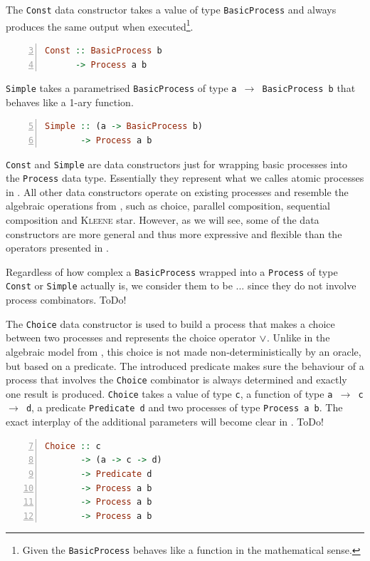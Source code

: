 The \texttt{Const} data constructor takes a value of type \texttt{BasicProcess} and always produces the same output when executed\footnote{Given the \texttt{BasicProcess} behaves like a function in the mathematical sense.}.
\begin{lstlisting}[language=Haskell,caption=Signature of the \texttt{Const} data constructor.,numbers=left,frame=bt,firstnumber=3]
Const :: BasicProcess b
      -> Process a b
\end{lstlisting}

\texttt{Simple} takes a parametrised \texttt{BasicProcess} of type \texttt{a $\to$ BasicProcess b} that behaves like a 1-ary function.
\begin{lstlisting}[language=Haskell,caption=Signature of the \texttt{Simple} data constructor.,numbers=left,frame=bt,firstnumber=5]
Simple :: (a -> BasicProcess b)
       -> Process a b
\end{lstlisting}

\texttt{Const} and \texttt{Simple} are data constructors just for wrapping basic processes into the \texttt{Process} data type. Essentially they represent what we calles atomic processes in . All other data constructors operate on existing processes and resemble the algebraic operations from , such as choice, parallel composition, sequential composition and \textsc{Kleene} star. However, as we will see, some of the data constructors are more general and thus more expressive and flexible than the operators presented in .

Regardless of how complex a \texttt{BasicProcess} wrapped into a \texttt{Process} of type \texttt{Const} or \texttt{Simple} actually is, we consider them to be ... since they do not involve process combinators. ToDo!

The \texttt{Choice} data constructor is used to build a process that makes a choice between two processes and represents the choice operator $\vee$. Unlike in the algebraic model from , this choice is not made non-deterministically by an oracle, but based on a predicate. The introduced predicate makes sure the behaviour of a process that involves the \texttt{Choice} combinator is always determined and exactly one result is produced. \texttt{Choice} takes a value of type \texttt{c}, a function of type \texttt{a $\to$ c $\to$ d}, a predicate \texttt{Predicate d} and two processes of type \texttt{Process a b}. The exact interplay of the additional parameters will become clear in . ToDo!
\begin{lstlisting}[language=Haskell,caption=Signature of the \texttt{Choice} data constructor.,numbers=left,frame=bt,firstnumber=7]
Choice :: c
       -> (a -> c -> d)
       -> Predicate d
       -> Process a b
       -> Process a b
       -> Process a b
\end{lstlisting}

